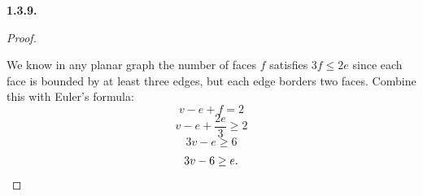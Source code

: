 \documentclass[10pt,]{book}
\theoremstyle{plain}
\theoremstyle{definition}
\theoremstyle{definition}
\theoremstyle{definition}
\theoremstyle{definition}
\numberwithin{equation}{chapter}
\begin{document}
\par\smallskip
\noindent\textbf{1.3.9.} \begin{proof}\hypertarget{proof-4}{}
\hypertarget{p-240}{}%
We know in any planar graph the number of faces \(f\) satisfies \(3f \le 2e\) since each face is bounded by at least three edges, but each edge borders two faces. Combine this with Euler's formula:%
\begin{equation*}
v - e + f = 2
\end{equation*}
%
\begin{equation*}
v - e + \frac{2e}{3} \ge 2
\end{equation*}
%
\begin{equation*}
3v - e \ge 6
\end{equation*}
%
\begin{equation*}
3v - 6 \ge e.\qedhere
\end{equation*}
%
\end{proof}
\par\smallskip
\end{document}
